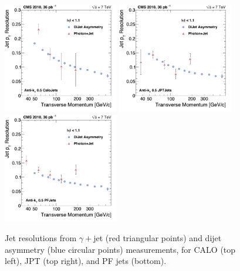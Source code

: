 \begin{figure}[t]
\centering
\includegraphics[width=0.45\textwidth]{Figures/JER/figs/res_photon/reso_dijet_gammajet_caloakt5}
\includegraphics[width=0.45\textwidth]{Figures/JER/figs/res_photon/reso_dijet_gammajet_jptakt5}
\includegraphics[width=0.45\textwidth]{Figures/JER/figs/res_photon/reso_dijet_gammajet_pfakt5}
\caption{Jet \pt resolutions from $\gamma+$jet (red triangular points) and dijet asymmetry (blue circular points) measurements, for CALO (top left), JPT (top right), and PF jets (bottom).}
\label{fig:gammajet_dijet}
\end{figure}

